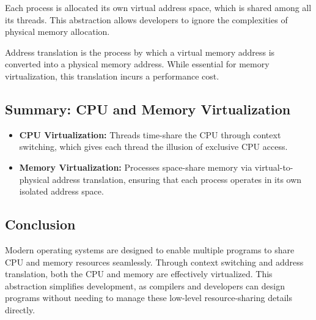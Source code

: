 \vspace{10px}
\begin{definition}
Each process is allocated its own virtual address space, which is shared among all its threads. This abstraction allows developers to ignore the complexities of physical memory allocation.
\end{definition}
\vspace{10px}
\begin{definition}
Address translation is the process by which a virtual memory address is converted into a physical memory address. While essential for memory virtualization, this translation incurs a performance cost.
\end{definition}

\subsection{Summary: CPU and Memory Virtualization}
\begin{itemize}
    \item \textbf{CPU Virtualization:} Threads time-share the CPU through context switching, which gives each thread the illusion of exclusive CPU access.
    \item \textbf{Memory Virtualization:} Processes space-share memory via virtual-to-physical address translation, ensuring that each process operates in its own isolated address space.
\end{itemize}

\subsection{Conclusion}
Modern operating systems are designed to enable multiple programs to share CPU and memory resources seamlessly. Through context switching and address translation, both the CPU and memory are effectively virtualized. This abstraction simplifies development, as compilers and developers can design programs without needing to manage these low-level resource-sharing details directly.


